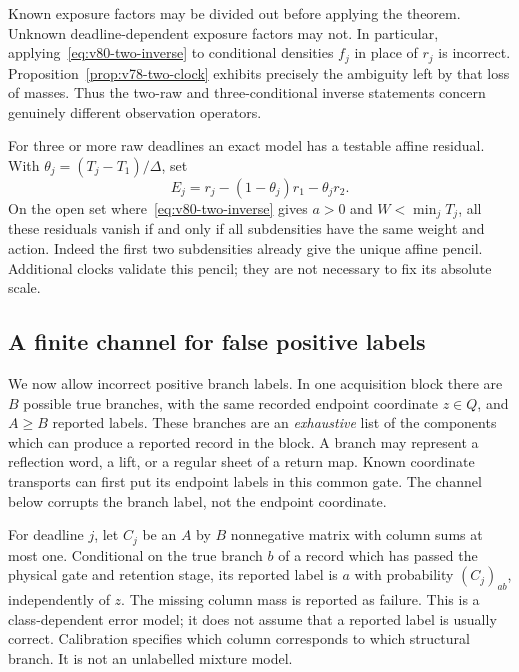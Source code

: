Known exposure factors may be divided out before applying the theorem.
Unknown deadline-dependent exposure factors may not.  In particular,
applying~\eqref{eq:v80-two-inverse} to conditional densities $f_j$ in
place of $r_j$ is incorrect.  Proposition~\ref{prop:v78-two-clock}
exhibits precisely the ambiguity left by that loss of masses.  Thus the
two-raw and three-conditional inverse statements concern genuinely
different observation operators.

For three or more raw deadlines an exact model has a testable affine
residual.  With $\theta_j=(T_j-T_1)/\Delta$, set
\begin{equation}\label{eq:v80-affine-residual}
             E_j=r_j-(1-\theta_j)r_1-\theta_jr_2.
\end{equation}
On the open set where~\eqref{eq:v80-two-inverse} gives $a>0$ and
$W<\min_jT_j$, all these residuals vanish if and only if all subdensities
have the same weight and action.  Indeed the first two subdensities
already give the unique affine pencil.  Additional clocks validate
this pencil; they are not necessary to fix its absolute scale.

\subsection{A finite channel for false positive labels}

We now allow incorrect positive branch labels.  In one acquisition block
there are $B$ possible true branches, with the same recorded endpoint
coordinate $z\in Q$, and $A\ge B$ reported labels.  These branches are an
\emph{exhaustive} list of the components which can produce a reported
record in the block.  A branch may represent a reflection word, a lift,
or a regular sheet of a return map.  Known coordinate transports can
first put its endpoint labels in this common gate.  The channel below
corrupts the branch label, not the endpoint coordinate.

For deadline $j$, let $C_j$ be an $A$ by $B$ nonnegative matrix with
column sums at most one.  Conditional on the true branch $b$ of a record
which has passed the physical gate and retention stage, its reported
label is $a$ with probability $(C_j)_{ab}$, independently of $z$.
The missing column mass is reported as failure.  This is a
class-dependent error model; it does not assume that a reported label
is usually correct.  Calibration specifies which column corresponds
to which structural branch.  It is not an unlabelled mixture model.

